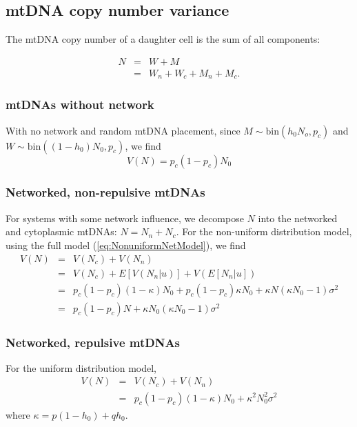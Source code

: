 \documentclass{article}
\begin{document}
\subsection*{mtDNA copy number variance}
The mtDNA copy number of a daughter cell is the sum of all components:

\begin{eqnarray}
  N & = & W + M \\
  & = & W_n + W_c + M_n + M_c.
\end{eqnarray}

\subsubsection*{mtDNAs without network}
With no network and random mtDNA placement, since $M\sim \mathrm{bin}(h_0N_o,p_c)$ and $W\sim\mathrm{bin}((1-h_0)N_0,p_c)$, we find
\begin{equation}\label{eq:App_mtCN_null}
    V(N)=p_c(1-p_c)N_0 
\end{equation}

\subsubsection*{Networked, non-repulsive mtDNAs}
For systems with some network influence, we decompose $N$ into the networked and cytoplasmic mtDNAs: $N=N_n+N_c$. For the non-uniform distribution model, using the full model (\ref{eq:NonuniformNetModel}), we find
    \begin{eqnarray}
    V(N)&=&V(N_c)+V(N_n)\\
         &=&V(N_c)+E[V(N_n|u)]+V(E[N_n|u])\\
         &=& p_c(1-p_c)(1-\kappa)N_0 + p_c(1-p_c)\kappa N_0+\kappa N(\kappa N_0-1)\sigma^2\\
         &=&p_c(1-p_c)N+\kappa N_0(\kappa N_0-1)\sigma^2
    \end{eqnarray}

\subsubsection*{Networked, repulsive mtDNAs}
For the uniform distribution model, 
\begin{eqnarray}
    V(N)&=&V(N_c)+V(N_n)\\
         &=&p_c(1-p_c)(1-\kappa)N_0 +\kappa^2 N_0^2\sigma^2
\end{eqnarray}
where $\kappa = p(1-h_0)+qh_0$.
\end{document}
